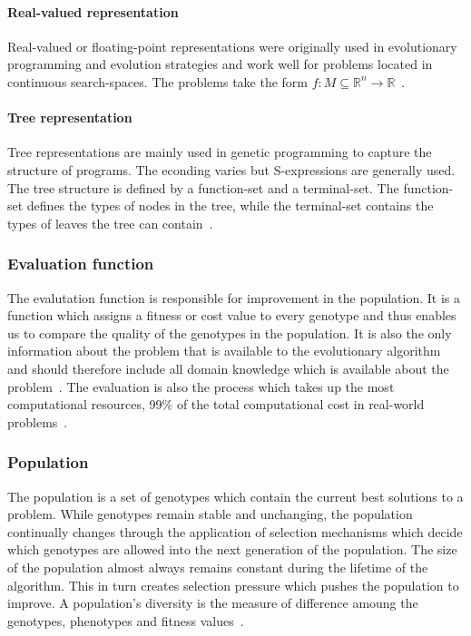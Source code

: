 \paragraph{Real-valued representation}

Real-valued or floating-point representations were originally used in evolutionary programming and evolution strategies and work well for problems located in continuous search-spaces. The problems take the form $f:M\subseteq \mathbb{R}^n \rightarrow \mathbb{R} $~\cite{back1997evolutionary}.

\paragraph{Tree representation}

Tree representations are mainly used in genetic programming to capture the structure of programs. The econding varies but S-expressions are generally used. The tree structure is defined by a function-set and a terminal-set. The function-set defines the types of nodes in the tree, while the terminal-set contains the types of leaves the tree can contain~\cite{Eiben201511}.

\subsubsection{Evaluation function}

The evalutation function is responsible for improvement in the population. It is a function which assigns a fitness or cost value to every genotype and thus enables us to compare the quality of the genotypes in the population. It is also the only information about the problem that is available to the evolutionary algorithm and should therefore include all domain knowledge which is available about the problem~\cite{Eiben2015_whatevolutionary}. The evaluation is also the process which takes up the most computational resources, 99\% of the total computational cost in real-world problems~\cite{Eiben20021}.

\subsubsection{Population}

The population is a set of genotypes which contain the current best solutions to a problem. While genotypes remain stable and unchanging, the population continually changes through the application of selection mechanisms which decide which genotypes are allowed into the next generation of the population. The size of the population almost always remains constant during the lifetime of the algorithm. This in turn creates selection pressure which pushes the population to improve. A population's diversity is the measure of difference amoung the genotypes, phenotypes and fitness values~\cite{Eiben2015_whatevolutionary}.

